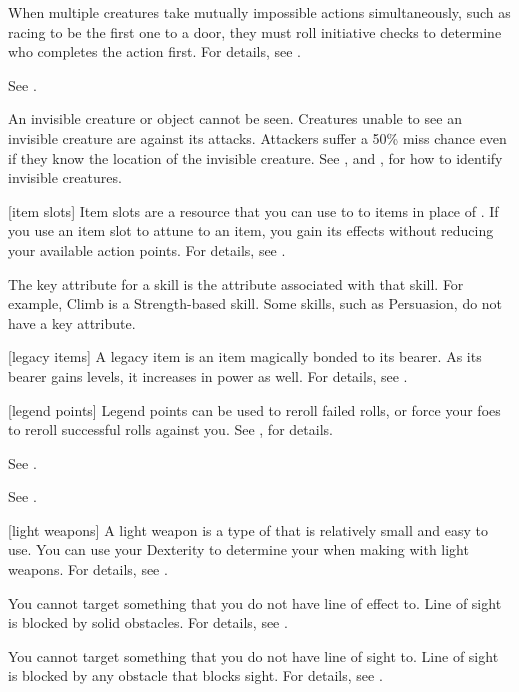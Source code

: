  When multiple creatures take mutually impossible actions simultaneously, such as racing to be the first one to a door, they must roll initiative checks to determine who completes the action first.
For details, see .

 See .

 An invisible creature or object cannot be seen. Creatures unable to see an invisible creature are  against its attacks. Attackers suffer a 50\% miss chance even if they know the location of the invisible creature. See , and , for how to identify invisible creatures.

[item slots] Item slots are a resource that you can use to  to items in place of .
If you use an item slot to attune to an item, you gain its effects without reducing your available action points.
For details, see .

 The key attribute for a skill is the attribute associated with that skill.
For example, Climb is a Strength-based skill.
Some skills, such as Persuasion, do not have a key attribute.

[legacy items] A legacy item is an item magically bonded to its bearer.
As its bearer gains levels, it increases in power as well.
For details, see .

[legend points] Legend points can be used to reroll failed rolls, or force your foes to reroll successful rolls against you. See , for details.

 See .

 See .

[light weapons] A light weapon is a type of  that is relatively small and easy to use.
You can use your Dexterity to determine your  when making  with light weapons.
For details, see .

 You cannot target something that you do not have line of effect to.
Line of sight is blocked by solid obstacles.
For details, see .

 You cannot target something that you do not have line of sight to.
Line of sight is blocked by any obstacle that blocks sight.
For details, see .

